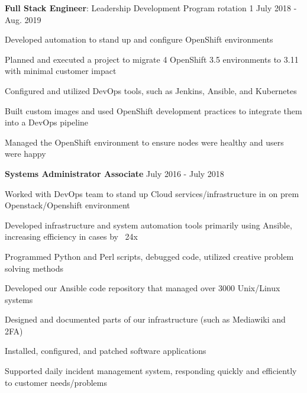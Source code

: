 \begin{cventries}

\vspace{-1.25em}
\cventry
{\textbf{Full Stack Engineer}: Leadership Development Program rotation 1} %
{} %
{} %
{July 2018 - Aug. 2019} %
{ %
\begin{cvitems}
\item {Developed automation to stand up and configure OpenShift environments}
\item {Planned and executed a project to migrate 4 OpenShift 3.5 environments to 3.11 with minimal customer impact}
\item {Configured and utilized DevOps tools, such as Jenkins, Ansible, and Kubernetes}
\item {Built custom images and used OpenShift development practices to integrate them into a DevOps pipeline}
\item {Managed the OpenShift environment to ensure nodes were healthy and users were happy}
\end{cvitems}
}


\vspace{-1.25em}
\cventry
{\textbf{Systems Administrator Associate}} %
{} %
{} %
{July 2016 - July 2018} %
{ %
\begin{cvitems}
\item{Worked with DevOps team to stand up Cloud services/infrastructure in on prem Openstack/Openshift environment}
\item{Developed infrastructure and system automation tools primarily using Ansible, increasing efficiency in cases by ~24x}
\item{Programmed Python and Perl scripts, debugged code, utilized creative problem solving methods}
\item{Developed our Ansible code repository that managed over 3000 Unix/Linux systems}
\item{Designed and documented parts of our infrastructure (such as Mediawiki and 2FA)}
\item{Installed, configured, and patched software applications}
\item{Supported daily incident management system, responding quickly and efficiently to customer needs/problems}
\end{cvitems}
}


\end{cventries}
